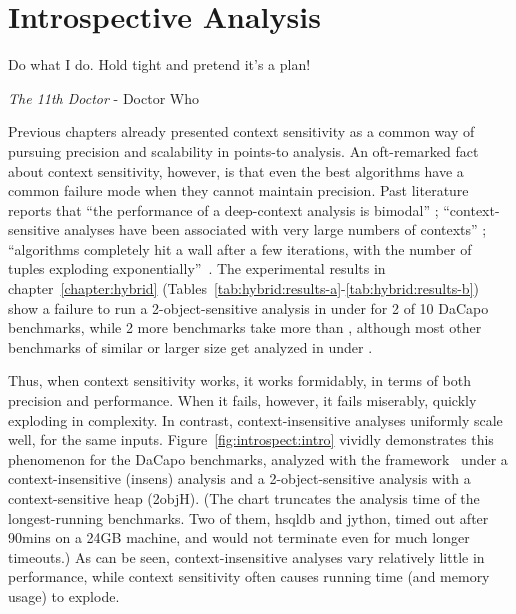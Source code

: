 \chapter{Introspective Analysis}
\label{chapter:introspective}
\epigraph{Do what I do. Hold tight and pretend it’s a plan!}{\textit{The 11th Doctor} - Doctor Who}

Previous chapters already presented context sensitivity as a common way of pursuing precision and scalability in points-to analysis. An oft-remarked fact about context sensitivity, however, is that even the best algorithms have a common failure mode when they cannot maintain precision. Past literature reports that ``the performance of a deep-context analysis is bimodal'' \cite{popl:2011:Smaragdakis}; ``context-sensitive analyses have been associated with very large numbers of contexts'' \cite{cc:2006:Lhotak}; ``algorithms completely hit a wall after a few iterations, with the number of tuples exploding exponentially''~\cite{pldi:2011:Liang}. The experimental results in chapter~\ref{chapter:hybrid} (Tables~\ref{tab:hybrid:results-a}-\ref{tab:hybrid:results-b}) show a failure to run a 2-object-sensitive analysis in under  for 2 of 10 DaCapo benchmarks, while 2 more benchmarks take more than , although most other benchmarks of similar or larger size get analyzed in under .

Thus, when context sensitivity works, it works formidably, in terms of both precision and performance. When it fails, however, it fails miserably, quickly exploding in complexity. In contrast, context-insensitive analyses uniformly scale well, for the same inputs. Figure~\ref{fig:introspect:intro} vividly demonstrates this phenomenon for the DaCapo benchmarks, analyzed with the \doop{} framework~\cite{oopsla:2009:Bravenboer} under a context-insensitive (insens) analysis and a 2-object-sensitive analysis with a context-sensitive heap (2objH). (The chart truncates the analysis time of the longest-running benchmarks. Two of them, hsqldb and jython, timed out after 90mins on a 24GB machine, and would not terminate even for much longer timeouts.) As can be seen, context-insensitive analyses vary relatively little in performance, while context sensitivity often causes running time (and memory usage) to explode.

